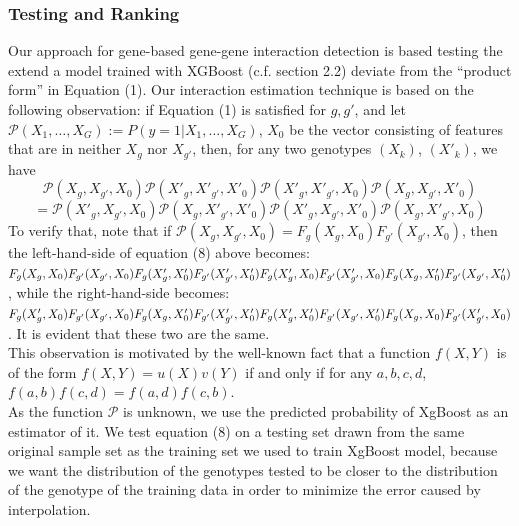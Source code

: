 \documentclass[11pt]{article}
\theoremstyle{plain}
\theoremstyle{definition}
\theoremstyle{remark}
\begin{document}

\subsubsection{Testing and Ranking}

Our approach for gene-based gene-gene interaction detection is based testing the extend a model trained with XGBoost (c.f. section 2.2) deviate from the ``product form'' in Equation (1). Our interaction estimation
technique is based on the following observation: if Equation (1) is satisfied for $g, g'$, and let $\mathcal{P}(X_1,\dots, X_G):=P(y=1|X_1,\dots, X_G)$, $X_0$ be the vector consisting of features that are in neither $X_g$ nor $X_{g'}$, then, for any two genotypes $(X_k)$, $(X'_k)$, we have
\begin{equation*}
\mathcal{P}(X_g, X_{g'}, X_0)\mathcal{P}(X'_g,X'_{g'},X'_0)\mathcal{P}(X'_g,X'_{g'},X_0)\mathcal{P}(X_g,X_{g'},X'_0)
\end{equation*}
\begin{equation}=\mathcal{P}(X'_g,X_{g'},X_0)\mathcal{P}(X_g,X'_{g'},X'_0)\mathcal{P}(X'_g,X_{g'},X'_0)\mathcal{P}(X_g,X'_{g'},X_0)
\end{equation}
To verify that, note that if $\mathcal{P}(X_g, X_{g'}, X_0)=F_g(X_g, X_0)F_{g'}(X_{g'},X_0)$, then the left-hand-side of equation (8) above becomes:
$F_g(X_g,X_0)F_{g'}(X_{g'},X_0)F_g(X'_g,X'_0)F_{g'}(X'_{g'},X'_0)F_g(X'_g,X_0)\\F_{g'}(X'_{g'},X_0)F_g(X_g,X'_0)F_{g'}(X_{g'},X'_0)$, 
while the right-hand-side becomes:
$F_g(X'_g,X_0)F_{g'}(X_{g'},X_0)\\F_g(X_g,X'_0)F_{g'}(X'_{g'},X'_0)F_g(X'_g,X'_0)F_{g'}(X_{g'},X'_0)F_g(X_g,X_0)F_{g'}(X'_{g'},X_0)$.
It is evident that these two are the same.\\

This observation is motivated by the well-known fact that a function $f(X,Y)$ is of the form $f(X,Y)=u(X)v(Y)$ if and only if for any $a,b,c,d$, $f(a,b)f(c,d)=f(a,d)f(c,b)$.\\

As the function $\mathcal{P}$ is unknown, we use the predicted probability of XgBoost as an estimator of it. We test equation (8) on a testing set drawn from the same original sample set as the training set we used to train XgBoost model, because we want the distribution of the genotypes tested to be closer to the distribution of the genotype of the training data in order to minimize the error caused by interpolation.\\
\end{document}
